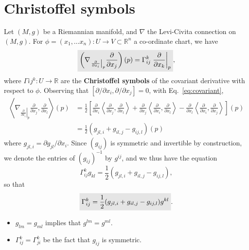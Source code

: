 \documentclass[letter-paper]{tufte-book}
\newenvironment{remark}[1][Remark]{\begin{trivlist}
\item[\hskip \labelsep {\bfseries #1}]}{\end{trivlist}}
\newcommand{\highlight}[1]{\mathchoice%
  {\colorbox{black!10}{$\displaystyle#1$}}%
  {\colorbox{black!10}{$\textstyle#1$}}%
  {\colorbox{black!10}{$\scriptstyle#1$}}%
  {\colorbox{black!10}{$\scriptscriptstyle#1$}}}%
\begin{document}

\section{Christoffel symbols}

Let $(M,g)$ be a Riemannian manifold, and $\nabla$ the Levi-Civita connection on $(M,g)$. For $\phi = (x_1, \ldots x_n): U\to V \subset \mathbb{R}^n$ a co-ordinate chart, we have
\begin{equation}
  \highlight{\left(\nabla_{\left.\frac{\partial}{\partial x_i}\right|_p} \frac{\partial}{\partial x_j}\right)(p) = \Gamma_{ij}^k \left.\frac{\partial}{\partial x_k}\right|_p},
\end{equation}
where $\Gamma{ij}^k : U\to\mathbb{R}$ are the \textbf{Christoffel symbols} of the covariant derivative with respect to $\phi$. Observing that $[\partial / \partial x_i, \partial / \partial x_j] = 0$, with Eq.~\eqref{eq:covariant},
\begin{align*}
  \left\langle \nabla_{\left.\frac{\partial}{\partial x_i}\right|_p} \frac{\partial}{\partial x_j}, \frac{\partial}{\partial x_l} \right\rangle(p)
    &= \frac{1}{2} \left[ \frac{\partial}{\partial x_i}\left\langle \frac{\partial}{\partial x_j}, \frac{\partial}{\partial x_l}\right\rangle + \frac{\partial}{\partial x_j}\left\langle \frac{\partial}{\partial x_i}, \frac{\partial}{\partial x_l}\right\rangle - \frac{\partial}{\partial x_l}\left\langle \frac{\partial}{\partial x_i}, \frac{\partial}{\partial x_j}\right\rangle \right](p)\\
    &= \frac{1}{2}(g_{jl,i} + g_{il,j} - g_{ij,l})(p)
\end{align*}
where $g_{jl,i} = \partial g_{jl} / \partial x_i$. Since $(g_{ij})$ is symmetric and invertible by construction, we denote the entries of $(g_{ij})^{-1}$ by $g^{ij}$, and we thus have the equation
\begin{equation*}
  \Gamma_{ij}^k g_{kl} = \frac{1}{2}(g_{jl,i} + g_{il,j} - g_{ij,l}),
\end{equation*}
so that
\begin{equation}
  \highlight{\Gamma_{ij}^k = \frac{1}{2}(g_{jl,i} + g_{il,j} - g_{ij,l})g^{kl}}.
\end{equation}

\begin{remark}
  \begin{itemize}
    \item $g_{lm} = g_{ml}$ implies that $g^{lm} = g^{ml}$.
    \item $\Gamma_{ij}^k = \Gamma_{ji}^k$ be the fact that $g_{ij}$ is symmetric.
  \end{itemize} 
\end{remark}
\end{document}
